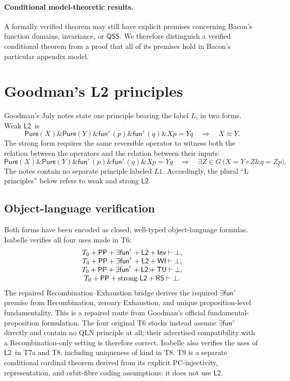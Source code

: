 \documentclass[12pt,leqno]{article}
\newcommand{\AND}{\ensuremath{\mathbin{\&}}}
\theoremstyle{plain}
\theoremstyle{definition}
\newcommand{\funp}{\ensuremath{\mathsf{fun}'\,}}
\newcommand{\Pure}{\ensuremath{\mathsf{Pure}}}
\newcommand{\PP}{\ensuremath{\mathsf{PP}}}
\newcommand{\Ltwo}{\ensuremath{\mathsf{L2}}}
\newcommand{\QSS}{\ensuremath{\mathsf{QSS}}}
\newcommand{\TU}{\ensuremath{\mathsf{TU}}}
\newcommand{\WI}{\ensuremath{\mathsf{WI}}}
\newcommand{\Inv}{\ensuremath{\mathsf{Inv}}}
\newcommand{\RS}{\ensuremath{\mathsf{RS}}}
\begin{document}
\paragraph{Conditional model-theoretic results.}
A formally verified theorem may still have explicit premises concerning
Bacon's function domains, invariance, or \QSS.  We therefore distinguish a
verified conditional theorem from a proof that all of its premises hold in
Bacon's particular appendix model.

\section{Goodman's L2 principles}

Goodman's July notes state one principle bearing the label \(L\), in two
forms.  Weak \Ltwo\ is
\[
 \Pure(X)\AND\Pure(Y)\AND\funp(p)\AND\funp(q)\AND Xp=Yq
 \quad\Longrightarrow\quad
 X\approx Y.
\tag{L2}
\]
The strong form requires the same reversible operator to witness both the
relation between the operators and the relation between their inputs:
\[
 \Pure(X)\AND\Pure(Y)\AND\funp(p)\AND\funp(q)\AND Xp=Yq
 \quad\Longrightarrow\quad
 \exists Z\in G\,
   \bigl(X=Y\circ Z\AND q=Zp\bigr).
\tag{strong L2}
\]
The notes contain no separate principle labeled \(L1\).  Accordingly, the
plural ``L principles'' below refers to weak and strong \Ltwo.

\subsection{Object-language verification}

Both forms have been encoded as closed, well-typed object-language formulas.
Isabelle verifies all four uses made in T6:
\[
\begin{array}{c}
 T_0+\PP+\exists\funp+\Ltwo+\Inv\vdash\bot,\\
 T_0+\PP+\exists\funp+\Ltwo+\WI\vdash\bot,\\
 T_0+\PP+\exists\funp+\Ltwo+\TU\vdash\bot,\\
 T_0+\PP+\text{strong \Ltwo}+\RS\vdash\bot.
\end{array}
\]
The repaired Recombination--Exhaustion bridge derives the required
\(\exists\funp\) premise from Recombination, zeroary Exhaustion, and unique
proposition-level fundamentality.  This is a repaired route from Goodman's
official fundamental-proposition formulation.  The four original T6 stocks
instead assume \(\exists\funp\) directly and contain no QLN principle at all;
their advertised compatibility with a Recombination-only setting is
therefore correct.  Isabelle also verifies the uses of \Ltwo\
in T7a and T8, including uniqueness of kind in T8.  T9 is a separate
conditional cardinal theorem derived from its explicit PC-injectivity,
representation, and orbit-fibre coding assumptions; it does not use \Ltwo.
\end{document}
